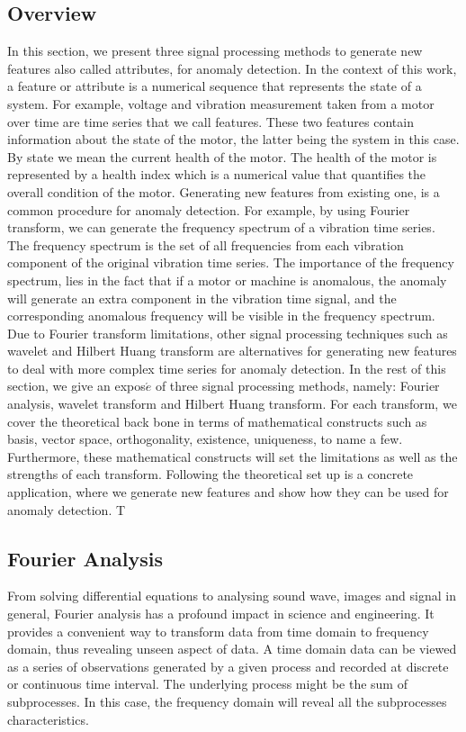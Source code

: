 \documentclass[11pt, oneside]{article}   	%
\begin{document}
\subsection{Overview}
 In this section, we present three signal processing methods to generate new features also called attributes, for anomaly detection. In the context of this work, a feature or attribute is a numerical sequence that represents the state of a system. For example, voltage and vibration measurement taken from a motor over time are time series that we call features. These two features contain information about the state of the motor, the latter being the system in this case. 
 By state we mean the current health of the motor. The health of the motor is represented by a health index which is a numerical value that quantifies the overall condition of the motor.
 \justify
 Generating new features from existing one, is a common procedure for anomaly detection. For example, by using Fourier transform, we can generate the frequency spectrum of a vibration time series. The frequency spectrum is the set of all frequencies from each vibration component of the original vibration time series. The importance of the frequency spectrum, lies in the fact that if a motor or machine is anomalous, the anomaly will generate an extra component in the vibration time signal, and the corresponding anomalous frequency will be visible in the frequency spectrum. Due to Fourier transform limitations, other signal processing techniques such as
  wavelet and Hilbert Huang transform are alternatives for generating new features to deal with more complex time series for anomaly detection.
 \justify
 In the rest of this section, we give an expos$\acute{e}$  of three signal processing methods, namely: Fourier analysis, wavelet transform and Hilbert Huang transform. For each transform, we cover the theoretical back bone in terms of mathematical constructs such as basis, vector space, orthogonality, existence, uniqueness, to name a few. Furthermore, these mathematical constructs will set the limitations as well as the strengths of each transform. Following the theoretical set up is a concrete application, where we generate new features and show how they can be used for anomaly detection. T
 


\subsection{Fourier Analysis}
From solving differential equations to analysing sound wave, images and signal in general, Fourier analysis has a profound impact in science and engineering. It provides a convenient way to transform data from time domain to frequency domain, thus revealing unseen aspect of data. A time domain data can be viewed as a series of observations generated by a given process and recorded at discrete or continuous time interval. The underlying process might be the sum of subprocesses. In this case, the frequency domain will reveal all the subprocesses characteristics.
\end{document}
